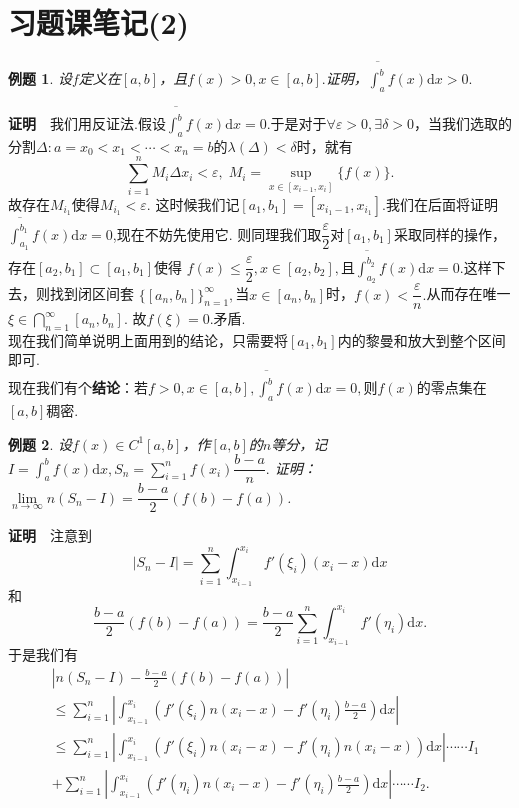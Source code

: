 \documentclass[UTF8]{article}
\newcommand{\dx}{\mathrm{d}x}
\newcommand{\zm}{\textbf{证明}$\quad$}
\newtheorem{exa}{\hspace{2em}例题}[section]
\begin{document}
\section{习题课笔记(2)}
\begin{exa}
  设$f$定义在$[a,b]$，且$f(x)>0,x\in[a,b].$证明，$\overline{\displaystyle\int_a^b}f(x)\dx>0.$
\end{exa}
\zm 我们用反证法.假设$\overline{\displaystyle\int_a^b}f(x)\dx=0.$于是对于$\forall\varepsilon>0,\exists\delta>0$，当我们选取的
分割$\Delta:a=x_0<x_1<\cdots<x_n=b$的$\lambda(\Delta)<\delta$时，就有
$$\sum_{i=1}^nM_i\Delta x_i<\varepsilon,\; M_i=\sup_{x\in[x_{i-1},x_i]}\{f(x)\}.$$
故存在$M_{i_1}$使得$M_{i_1}<\varepsilon.$
这时候我们记$[a_1,b_1]=[x_{i_1-1},x_{i_1}]$.我们在后面将证明$\overline{\displaystyle\int_{a_1}^{b_1}}f(x)\dx=0$,现在不妨先使用它.
则同理我们取$\dfrac{\varepsilon}{2}$对$[a_1,b_1]$采取同样的操作，存在$[a_2,b_1]\subset[a_1,b_1]$使得
$f(x)\le\dfrac{\varepsilon}{2},x\in[a_2,b_2],$且$\overline{\displaystyle\int_{a_2}^{b_2}}f(x)\dx=0.$这样下去，则找到闭区间套
$\{[a_n,b_n]\}_{n=1}^\infty,$当$x\in[a_n,b_n]$时，$f(x)<\dfrac{\varepsilon}{n}.$从而存在唯一$\xi\in\bigcap_{n=1}^\infty[a_n,b_n]$.
故$f(\xi)=0.$矛盾.\\
现在我们简单说明上面用到的结论，只需要将$[a_1,b_1]$内的黎曼和放大到整个区间即可.\\
现在我们有个\textbf{结论}：若$f>0,x\in[a,b],\overline{\displaystyle\int_a^b}f(x)\dx=0,$则$f(x)$的零点集在$[a,b]$稠密.
\begin{exa}
  设$f(x)\in C^1[a,b]$，作$[a,b]$的$n$等分，记$I=\displaystyle\int_a^bf(x)\dx,S_n=\sum\limits_{i=1}^nf(x_i)\dfrac{b-a}{n}.$
  证明：$\lim\limits_{n\to\infty}n(S_n-I)=\dfrac{b-a}{2}\left(f(b)-f(a)\right)$.
\end{exa}
\zm 注意到$$|S_n-I|=\sum_{i=1}^n\int_{x_{i-1}}^{x_i}f'(\xi_i)(x_i-x)\dx$$和
$$\frac{b-a}{2}(f(b)-f(a))=\frac{b-a}{2}\sum_{i=1}^n\int_{x_{i-1}}^{x_i}f'(\eta_i)\dx.$$
于是我们有
\begin{align*}
  &\left|n(S_n-I)-\frac{b-a}{2}(f(b)-f(a))\right|\\
  &\le\sum_{i=1}^n\left|\int_{x_{i-1}}^{x_i}\left(f'(\xi_i)n(x_i-x)-f'(\eta_i)\frac{b-a}{2}\right)\dx\right|\\
  &\le\sum_{i=1}^n\left|\int_{x_{i-1}}^{x_i}\left( f'(\xi_i)n(x_i-x)-f'(\eta_i)n(x_i-x) \right)\dx\right|\cdots\cdots I_1\\
  &+\sum_{i=1}^n\left|\int_{x_{i-1}}^{x_i}\left(f'(\eta_i)n(x_i-x)-f'(\eta_i)\frac{b-a}{2}\right)\dx\right|\cdots\cdots I_2.
\end{align*}
\end{document}
